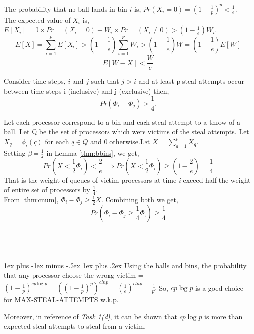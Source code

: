 \documentclass[11pt]{article}
\makeatletter
\renewcommand{\subsection}{\@startsection{subsection}{2}{0mm}%
                                     {1ex plus -1ex minus -.2ex}%
                                     {1ex plus .2ex}%
                                     {\normalfont\large\bfseries}}%
\makeatother
\begin{document}
The probability that no ball lands in bin $i$ is, $Pr ( X_i = 0 ) = \left( 1 - \frac{1}{p} \right)^p < \frac {1}{e}$.\\
The expected value of $X_i$ is, $E \left[ X_i \right] = 0 \times Pr =\left( X_i = 0 \right) + W_i \times 
Pr =\left( X_i \ne 0 \right) > \left( 1 - \frac{1}{e} \right) W_i$.\\
\[
E \left[ X \right] = \sum \limits_{i=1}^p E \left[ X_i \right] > \left( 1 - \frac{1}{e} \right) \sum \limits_{i=1}^p W_i >\left( 1 - \frac{1}{e} \right) W = \left( 1 - \frac{1}{e} \right) E\left[ W \right] 
\]
\[
E \left[ W - X \right] < \frac {W}{e}
\]


Consider time steps, $i$ and $j$ such that $j > i$ and at least p steal attempts occur between time steps i (inclusive) and j (exclusive) then,
\[
Pr \left( \Phi_i - \Phi_j \right)  > \frac {1}{4}.
\]
\label{thm:phases}


Let each processor correspond to a bin and each steal attempt to a throw of a ball. Let Q be the set of processors which were victims of the steal attempts. Let $X_q = \phi_i(q)$ for each $q \in Q$ and $0$ otherwise.Let  $X = \sum \limits_{q=1}^p X_q$.\\
Setting $\beta = \frac {1}{2}$ in Lemma \ref{thm:bbins}, we get,
\[
Pr \left( X < \frac{1}{2} \Phi_i \right) < \frac {2}{e} \implies Pr \left( X < \frac{1}{2} \Phi_i \right) \ge \left( 1 - \frac {2}{e} \right) = \frac {1}{4}
\]
That is the weight of queues of victim processors at time $i$ exceed half the weight of entire set of processors by $\frac {1}{4}$.\\
From \ref{thm:cnum}, $\Phi_i - \Phi_j \ge \frac{1}{2} X$. Combining both we get,
\[
Pr \left( \Phi_i - \Phi_j \ge \frac {1}{4} \Phi_i \right) \ge  \frac {1}{4}
\]\\\\\\\\





\subsection{}
Using the balls and bins, the probability that any processor choose the wrong victim = ${(1-\frac{1}{p})}^{cp \log p} = {({(1-\frac{1}{p})}^p)}^{clnp} = {(\frac{1}{e})}^{clnp} = \frac{1}{p^c}$
So, $cp\log p$ is a good choice for MAX-STEAL-ATTEMPTS w.h.p. 

Moreover, in reference of {\it Task 1(d)}, it can be shown that  $cp \log p$ is more than expected steal attempts to steal from a victim.
\end{document}
